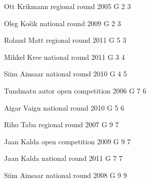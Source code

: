 \documentclass[11pt]{article}
\begin{document}
\ylDisplay{} %
{Ott Krikmann} %
{regional round} %
{2005} %
{G 2} %
{3} %
{

\ifEngSolution
\fi
}

\ylDisplay{} %
{Oleg Košik} %
{national round} %
{2009} %
{G 2} %
{3} %
{

\ifEngSolution
\fi
}

\ylDisplay{} %
{Roland Matt} %
{regional round} %
{2011} %
{G 5} %
{3} %
{

\ifEngSolution
\fi
}

\ylDisplay{} %
{Mihkel Kree} %
{national round} %
{2011} %
{G 3} %
{4} %
{

\ifEngSolution
\fi
}

\ylDisplay{} %
{Siim Ainsaar} %
{national round} %
{2010} %
{G 4} %
{5} %
{

\ifEngSolution
\fi
}

\ylDisplay{} %
{Tundmatu autor} %
{open competition} %
{2006} %
{G 7} %
{6} %
{

\ifEngSolution
\fi
}

\ylDisplay{} %
{Aigar Vaigu} %
{national round} %
{2010} %
{G 5} %
{6} %
{

\ifEngSolution
\fi
}

\ylDisplay{} %
{Riho Taba} %
{regional round} %
{2007} %
{G 9} %
{7} %
{

\ifEngSolution
\fi
}

\ylDisplay{} %
{Jaan Kalda} %
{open competition} %
{2009} %
{G 9} %
{7} %
{

\ifEngSolution
\fi
}

\ylDisplay{} %
{Jaan Kalda} %
{national round} %
{2011} %
{G 7} %
{7} %
{

\ifEngSolution
\fi
}

\ylDisplay{} %
{Siim Ainsaar} %
{national round} %
{2008} %
{G 9} %
{9} %
{

\ifEngSolution
\fi
}
\end{document}
